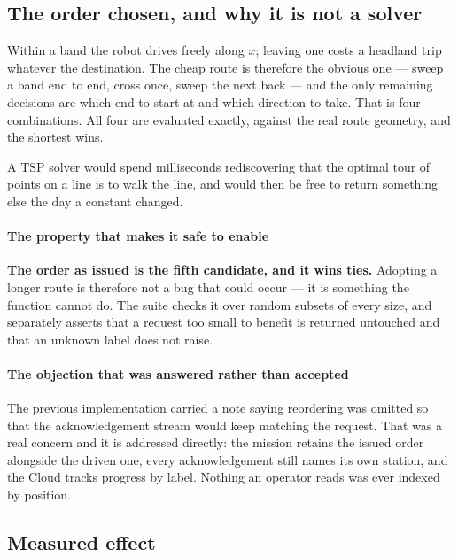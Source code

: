 \subsection{The order chosen, and why it is not a solver}

Within a band the robot drives freely along $x$; leaving one costs a
headland trip whatever the destination. The cheap route is therefore the
obvious one --- sweep a band end to end, cross once, sweep the next back
--- and the only remaining decisions are which end to start at and which
direction to take. That is four combinations. All four are evaluated
exactly, against the real route geometry, and the shortest wins.

A TSP solver would spend milliseconds rediscovering that the optimal tour
of points on a line is to walk the line, and would then be free to return
something else the day a constant changed.

\paragraph{The property that makes it safe to enable} \textbf{The order
as issued is the fifth candidate, and it wins ties.} Adopting a longer
route is therefore not a bug that could occur --- it is something the
function cannot do. The suite checks it over  random
subsets of every size, and separately asserts that a request too small to
benefit is returned untouched and that an unknown label does not raise.

\paragraph{The objection that was answered rather than accepted} The
previous implementation carried a note saying reordering was omitted so
that the acknowledgement stream would keep matching the request. That
was a real concern and it is addressed directly: the mission retains the
issued order alongside the driven one, every acknowledgement still names
its own station, and the Cloud tracks progress by label. Nothing an
operator reads was ever indexed by position.

\subsection{Measured effect}

